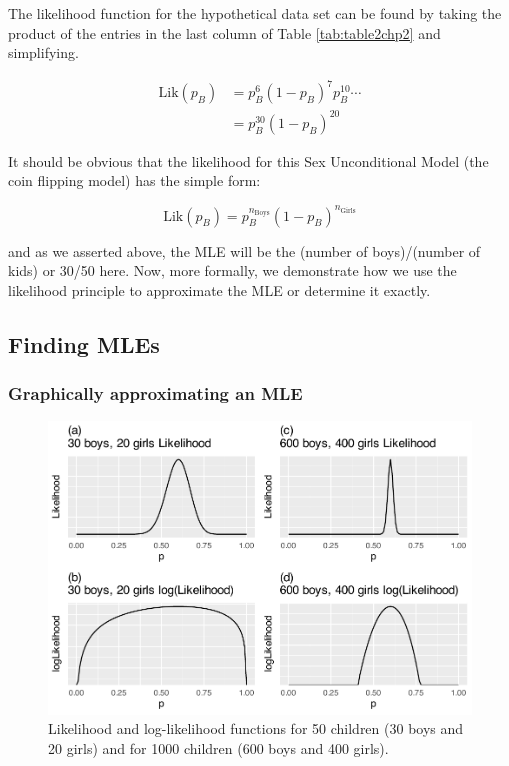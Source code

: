 \documentclass[
]{krantz}
\newcommand{\lik}{\mathrm{Lik}}
\begin{document}
The likelihood function for the hypothetical data set can be found by taking the product of the entries in the last column of Table \ref{tab:table2chp2} and simplifying.

\begin{equation}
\begin{split}
 \lik(p_B) &= p_B^{6}(1-p_B)^{7}p_B^{10} \cdots \\
 &= p_B^{30}(1-p_B)^{20}
\end{split}
\label{eq:lik30} 
\end{equation}

It should be obvious that the likelihood for this Sex Unconditional Model (the coin flipping model) has the simple form:

\begin{equation*}
\lik(p_B) = p_B^{n_\textrm{Boys}}(1-p_B)^{n_\textrm{Girls}}
\end{equation*}

and as we asserted above, the MLE will be the (number of boys)/(number of kids) or 30/50 here. Now, more formally, we demonstrate how we use the likelihood principle to approximate the MLE or determine it exactly.

\hypertarget{findMLE.sec}{%
\subsection{Finding MLEs}\label{findMLE.sec}}

\hypertarget{MLEgph.sec}{%
\subsubsection{Graphically approximating an MLE}\label{MLEgph.sec}}

\begin{figure}

{\centering \includegraphics[width=0.9\linewidth]{bookdown-BeyondMLR_files/figure-latex/lik4-1} 

}

\caption{Likelihood and log-likelihood functions for 50 children (30 boys and 20 girls) and for 1000 children (600 boys and 400 girls).}\label{fig:lik4}
\end{figure}
\end{document}

